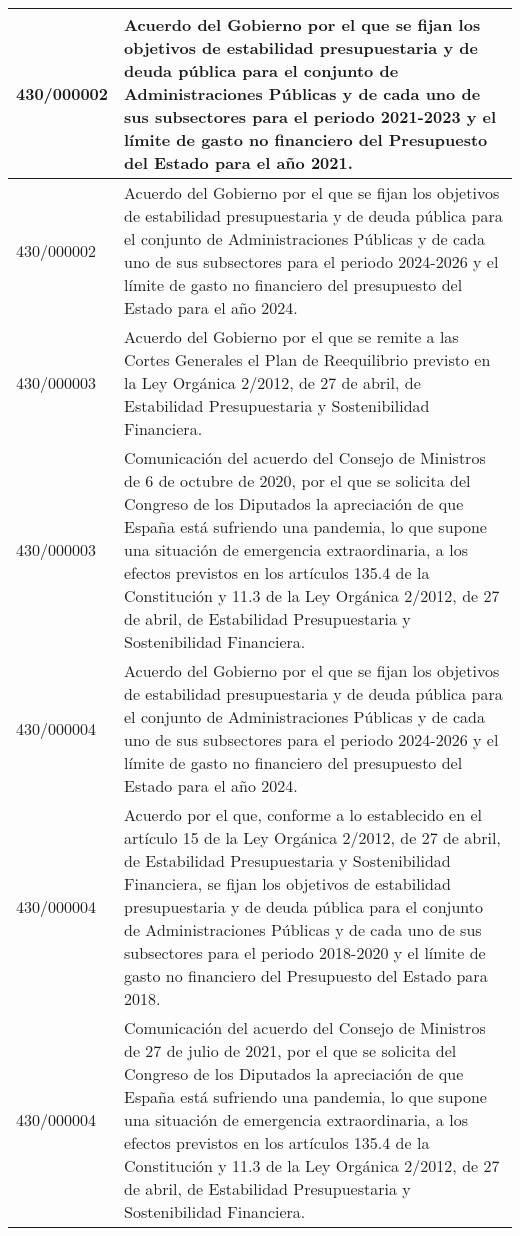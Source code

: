 {\begin{table}[H]
\begin{center}
\begin{tabularx}{\linewidth}{| l | X |}
\hline
430/000002 & Acuerdo del Gobierno por el que se fijan los objetivos de estabilidad presupuestaria y de deuda pública para el conjunto de Administraciones Públicas y de cada uno de sus subsectores para el periodo 2021-2023 y el límite de gasto no financiero del Presupuesto del Estado para el año 2021. \\
\hline
430/000002 & Acuerdo del Gobierno por el que se fijan los objetivos de estabilidad presupuestaria y de deuda pública para el conjunto de Administraciones Públicas y de cada uno de sus subsectores para el periodo 2024-2026 y el límite de gasto no financiero del presupuesto del Estado para el año 2024. \\
\hline
430/000003 & Acuerdo del Gobierno por el que se remite a las Cortes Generales el Plan de Reequilibrio previsto en la Ley Orgánica 2/2012, de 27 de abril, de Estabilidad Presupuestaria y Sostenibilidad Financiera. \\
\hline
430/000003 & Comunicación del acuerdo del Consejo de Ministros de 6 de octubre de 2020, por el que se solicita del Congreso de los Diputados la apreciación de que España está sufriendo una pandemia, lo que supone una situación de emergencia extraordinaria, a los efectos previstos en los artículos 135.4 de la Constitución y 11.3 de la Ley Orgánica 2/2012, de 27 de abril, de Estabilidad Presupuestaria y Sostenibilidad Financiera. \\
\hline
430/000004 & Acuerdo del Gobierno por el que se fijan los objetivos de estabilidad presupuestaria y de deuda pública para el conjunto de Administraciones Públicas y de cada uno de sus subsectores para el periodo 2024-2026 y el límite de gasto no financiero del presupuesto del Estado para el año 2024. \\
\hline
430/000004 & Acuerdo por el que, conforme a lo establecido en el artículo 15 de la Ley Orgánica 2/2012, de 27 de abril, de Estabilidad Presupuestaria y Sostenibilidad Financiera, se fijan los objetivos de estabilidad presupuestaria y de deuda pública para el conjunto de Administraciones Públicas y de cada uno de sus subsectores para el periodo 2018-2020 y el límite de gasto no financiero del Presupuesto del Estado para 2018. \\
\hline
430/000004 & Comunicación del acuerdo del Consejo de Ministros de 27 de julio de 2021, por el que se solicita del Congreso de los Diputados la apreciación de que España está sufriendo una pandemia, lo que supone una situación de emergencia extraordinaria, a los efectos previstos en los artículos 135.4 de la Constitución y 11.3 de la Ley Orgánica 2/2012, de 27 de abril, de Estabilidad Presupuestaria y Sostenibilidad Financiera. \\

\end{tabularx}
\end{center}
\end{table}}
